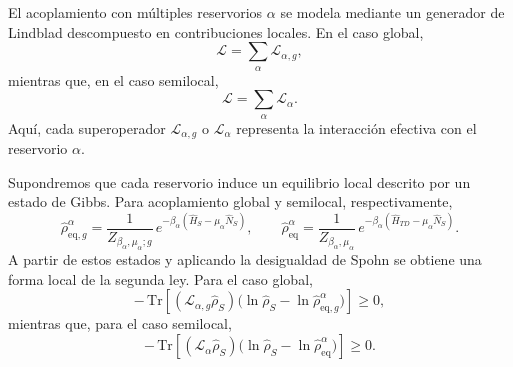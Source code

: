 El acoplamiento con múltiples reservorios $\alpha$ se modela mediante un generador de Lindblad descompuesto en contribuciones locales. En el caso global,
\begin{equation*}
    \mathcal{L}=\sum_{\alpha}\mathcal{L}_{\alpha,g},
\end{equation*}
mientras que, en el caso semilocal,
\begin{equation*}
    \mathcal{L}=\sum_{\alpha}\mathcal{L}_{\alpha}.
\end{equation*}
Aquí, cada superoperador $\mathcal{L}_{\alpha,g}$ o $\mathcal{L}_{\alpha}$ representa la interacción efectiva con el reservorio $\alpha$.

Supondremos que cada reservorio induce un equilibrio local descrito por un estado de Gibbs. Para acoplamiento global y semilocal, respectivamente,
\[
\hat{\rho}_{\mathrm{eq},g}^{\alpha}
=\frac{1}{Z_{\beta_{\alpha},\mu_{\alpha};g}}
\,e^{-\beta_{\alpha}(\hat{H}_{S}-\mu_{\alpha}\hat{N}_{S})},
\qquad
\hat{\rho}_{\mathrm{eq}}^{\alpha}
=\frac{1}{Z_{\beta_{\alpha},\mu_{\alpha}}}
\,e^{-\beta_{\alpha}(\hat{H}_{TD}-\mu_{\alpha}\hat{N}_{S})}.
\]
A partir de estos estados y aplicando la desigualdad de Spohn \cite{spohn1978entropy} se obtiene una forma local de la segunda ley. Para el caso global,
\begin{equation}
    -\,\mathrm{Tr}\!\left[(\mathcal{L}_{\alpha,g}\hat{\rho}_{S})
      \big(\ln\hat{\rho}_{S}-\ln\hat{\rho}_{\mathrm{eq},g}^{\alpha}\big)\right]\ge 0,
    \label{spohninfo}
\end{equation}
mientras que, para el caso semilocal,
\begin{equation}
    -\,\mathrm{Tr}\!\left[(\mathcal{L}_{\alpha}\hat{\rho}_{S})
      \big(\ln\hat{\rho}_{S}-\ln\hat{\rho}_{\mathrm{eq}}^{\alpha}\big)\right]\ge 0.
    \label{spohninfolocal}
\end{equation}

